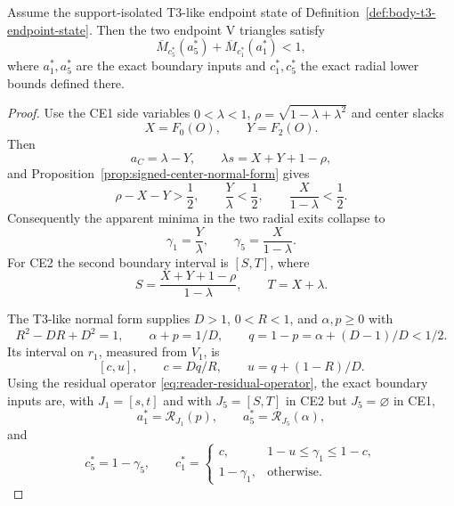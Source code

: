 \begin{lemma}
\label{lem:407-four-label-loss}
\label{thm:s2-geom-t3}
Assume the support-isolated T3-like endpoint state of
Definition~\ref{def:body-t3-endpoint-state}.  Then the two endpoint V triangles
satisfy
\begin{equation}
 \overline M_{c_5^\ast}(a_5^\ast)+\overline M_{c_1^\ast}(a_1^\ast)<1,
 \label{eq:407-loss}
\end{equation}
where $a_1^\ast,a_5^\ast$ are the exact boundary inputs and
$c_1^\ast,c_5^\ast$ the exact radial lower bounds defined there.
\end{lemma}

\begin{proof}
Use the CE1 side variables $0<\lambda<1$,
$\rho=\sqrt{1-\lambda+\lambda^2}$ and center slacks
\[
 X=F_0(O),\qquad Y=F_2(O).
\]
Then
\[
 a_C=\lambda-Y,\qquad
 \lambda s=X+Y+1-\rho,
\]
and Proposition~\ref{prop:signed-center-normal-form} gives
\[
 \rho-X-Y>\frac12,\qquad
 \frac Y\lambda<\frac12,\qquad
 \frac X{1-\lambda}<\frac12.
\]
Consequently the apparent minima in the two radial exits collapse to
\[
 \gamma_1=\frac Y\lambda,\qquad
 \gamma_5=\frac X{1-\lambda}.
\]
For CE2 the second boundary interval is $[S,T]$, where
\[
 S=\frac{X+Y+1-\rho}{1-\lambda},\qquad T=X+\lambda.
\]

The T3-like normal form supplies $D>1$, $0<R<1$, and $\alpha,p\ge0$ with
\[
 R^2-DR+D^2=1,\qquad \alpha+p=1/D,\qquad
 q=1-p=\alpha+(D-1)/D<1/2.
\]
Its interval on $r_1$, measured from $V_1$, is
\[
 [c,u],\qquad c=Dq/R,\qquad u=q+(1-R)/D.
\]
Using the residual operator \eqref{eq:reader-residual-operator}, the exact
boundary inputs are, with $J_1=[s,t]$ and with $J_5=[S,T]$ in CE2 but
$J_5=\varnothing$ in CE1,
\[
 a_1^\ast=\mathcal R_{J_1}(p),\qquad
 a_5^\ast=\mathcal R_{J_5}(\alpha),
\]
and
\[
 c_5^\ast=1-\gamma_5,\qquad
 c_1^\ast=
 \begin{cases}
 c,&1-u\le\gamma_1\le1-c,\\
 1-\gamma_1,&\text{otherwise}.
 \end{cases}
\]


\end{proof}
